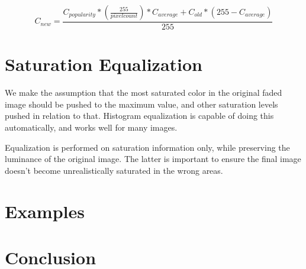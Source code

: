 \documentclass{article}
\begin{document}
\[ C_{new} = \frac{C_{popularity} * \left(\frac{255}{pixel count}\right) * C_{average}
                   + C_{old} * \left(255 - C_{average}\right)}{255} \]

\section{Saturation Equalization}
We make the assumption that the most saturated color in the original faded
image should be pushed to the maximum value, and other saturation levels
pushed in relation to that. Histogram equalization is capable of doing this 
automatically, and works well for many images.

Equalization is performed on saturation information only, while
preserving the luminance of the original image. The latter is important to
ensure the final image doesn't become unrealistically saturated in the wrong areas.

\section{Examples}

\section{Conclusion}
\end{document}
